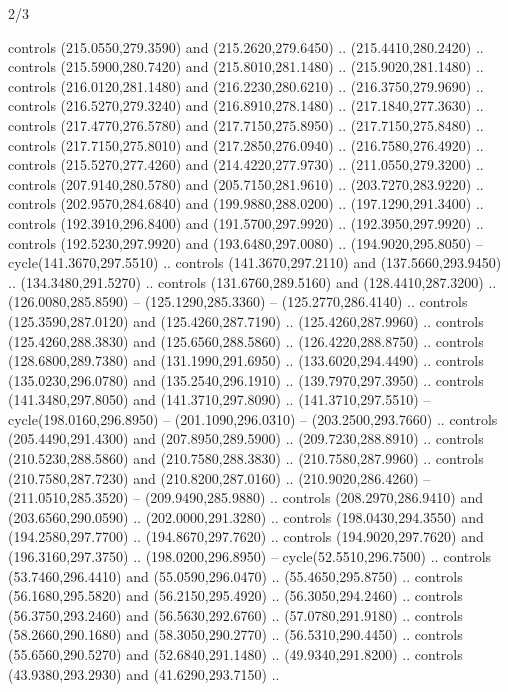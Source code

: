 \begin{flagdescription}{2/3}
\begin{scope}[xshift=0.5\flaglength,yshift=0.5\flagwidth,scale=\stretchfactor]
\begin{scope}[scale=0.001645\flagwidth,yshift=65mm,xshift=-63mm]
\begin{scope}[y=0.80pt, x=0.80pt, yscale=-1,]
\begin{scope}[cm={{1.33333,0.0,0.0,1.33333,(0.0,1e-05)}}]
  controls (215.0550,279.3590) and (215.2620,279.6450) .. (215.4410,280.2420) ..
  controls (215.5900,280.7420) and (215.8010,281.1480) .. (215.9020,281.1480) ..
  controls (216.0120,281.1480) and (216.2230,280.6210) .. (216.3750,279.9690) ..
  controls (216.5270,279.3240) and (216.8910,278.1480) .. (217.1840,277.3630) ..
  controls (217.4770,276.5780) and (217.7150,275.8950) .. (217.7150,275.8480) ..
  controls (217.7150,275.8010) and (217.2850,276.0940) .. (216.7580,276.4920) ..
  controls (215.5270,277.4260) and (214.4220,277.9730) .. (211.0550,279.3200) ..
  controls (207.9140,280.5780) and (205.7150,281.9610) .. (203.7270,283.9220) ..
  controls (202.9570,284.6840) and (199.9880,288.0200) .. (197.1290,291.3400) ..
  controls (192.3910,296.8400) and (191.5700,297.9920) .. (192.3950,297.9920) ..
  controls (192.5230,297.9920) and (193.6480,297.0080) .. (194.9020,295.8050) --
  cycle(141.3670,297.5510) .. controls (141.3670,297.2110) and
  (137.5660,293.9450) .. (134.3480,291.5270) .. controls (131.6760,289.5160) and
  (128.4410,287.3200) .. (126.0080,285.8590) -- (125.1290,285.3360) --
  (125.2770,286.4140) .. controls (125.3590,287.0120) and (125.4260,287.7190) ..
  (125.4260,287.9960) .. controls (125.4260,288.3830) and (125.6560,288.5860) ..
  (126.4220,288.8750) .. controls (128.6800,289.7380) and (131.1990,291.6950) ..
  (133.6020,294.4490) .. controls (135.0230,296.0780) and (135.2540,296.1910) ..
  (139.7970,297.3950) .. controls (141.3480,297.8050) and (141.3710,297.8090) ..
  (141.3710,297.5510) -- cycle(198.0160,296.8950) -- (201.1090,296.0310) --
  (203.2500,293.7660) .. controls (205.4490,291.4300) and (207.8950,289.5900) ..
  (209.7230,288.8910) .. controls (210.5230,288.5860) and (210.7580,288.3830) ..
  (210.7580,287.9960) .. controls (210.7580,287.7230) and (210.8200,287.0160) ..
  (210.9020,286.4260) -- (211.0510,285.3520) -- (209.9490,285.9880) .. controls
  (208.2970,286.9410) and (203.6560,290.0590) .. (202.0000,291.3280) .. controls
  (198.0430,294.3550) and (194.2580,297.7700) .. (194.8670,297.7620) .. controls
  (194.9020,297.7620) and (196.3160,297.3750) .. (198.0200,296.8950) --
  cycle(52.5510,296.7500) .. controls (53.7460,296.4410) and (55.0590,296.0470)
  .. (55.4650,295.8750) .. controls (56.1680,295.5820) and (56.2150,295.4920) ..
  (56.3050,294.2460) .. controls (56.3750,293.2460) and (56.5630,292.6760) ..
  (57.0780,291.9180) .. controls (58.2660,290.1680) and (58.3050,290.2770) ..
  (56.5310,290.4450) .. controls (55.6560,290.5270) and (52.6840,291.1480) ..
  (49.9340,291.8200) .. controls (43.9380,293.2930) and (41.6290,293.7150) ..

\end{scope}
\end{scope}
\end{scope}
\end{scope}
\end{flagdescription}
